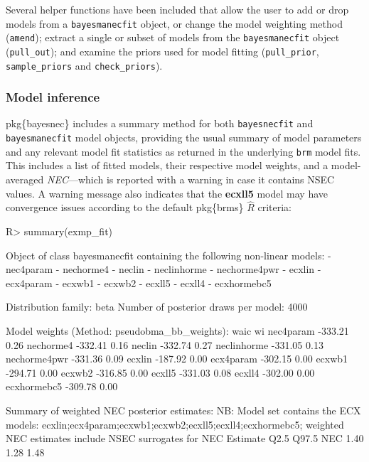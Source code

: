 \documentclass[
]{jss}
\begin{document}
Several helper functions have been included that allow the user to add
or drop models from a \texttt{bayesmanecfit} object, or change the model
weighting method (\texttt{amend}); extract a single or subset of models
from the \texttt{bayesmanecfit} object (\texttt{pull\_out}); and examine
the priors used for model fitting (\texttt{pull\_prior},
\texttt{sample\_priors} and \texttt{check\_priors}).

\hypertarget{model-inference}{%
\subsubsection{Model inference}\label{model-inference}}

pkg\{bayesnec\} includes a summary method for both \texttt{bayesnecfit}
and \texttt{bayesmanecfit} model objects, providing the usual summary of
model parameters and any relevant model fit statistics as returned in
the underlying \texttt{brm} model fits. This includes a list of fitted
models, their respective model weights, and a model-averaged
\emph{NEC}---which is reported with a warning in case it contains NSEC
values. A warning message also indicates that the \textbf{ecxll5} model
may have convergence issues according to the default pkg\{brms\}
\(\widehat{R}\) criteria:

\begin{CodeChunk}
\begin{CodeInput}
R> summary(exmp_fit)
\end{CodeInput}
\begin{CodeOutput}
Object of class bayesmanecfit containing the following non-linear models:
  -  nec4param
  -  nechorme4
  -  neclin
  -  neclinhorme
  -  nechorme4pwr
  -  ecxlin
  -  ecx4param
  -  ecxwb1
  -  ecxwb2
  -  ecxll5
  -  ecxll4
  -  ecxhormebc5

Distribution family: beta
Number of posterior draws per model:  4000

Model weights (Method: pseudobma_bb_weights):
                waic   wi
nec4param    -333.21 0.26
nechorme4    -332.41 0.16
neclin       -332.74 0.27
neclinhorme  -331.05 0.13
nechorme4pwr -331.36 0.09
ecxlin       -187.92 0.00
ecx4param    -302.15 0.00
ecxwb1       -294.71 0.00
ecxwb2       -316.85 0.00
ecxll5       -331.03 0.08
ecxll4       -302.00 0.00
ecxhormebc5  -309.78 0.00


Summary of weighted NEC posterior estimates:
NB: Model set contains the ECX models: ecxlin;ecx4param;ecxwb1;ecxwb2;ecxll5;ecxll4;ecxhormebc5; weighted NEC estimates include NSEC surrogates for NEC
    Estimate Q2.5 Q97.5
NEC     1.40 1.28  1.48
\end{CodeOutput}
\end{CodeChunk}
\end{document}
